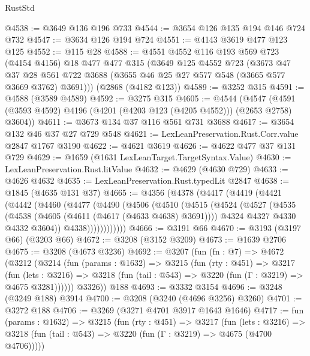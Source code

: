 \begin{lexlean}{RustStd}
\begin{coremodule}
@4538 := @3649 @136 @196 @733
@4544 := @3654 @126 @135 @194 @146 @724 @732
@4547 := @3634 @126 @194 @724
@4551 := @4143 @3619 @477 @123 @125
@4552 := @115 @28
@4588 := @4551
    @4552
    @116
    @193
    @569
    @723
    (@4154 @4156)
    @18
    @477
    @477
    @315
    (@3649
      @125
      @4552
      @723
      (@3673
        @47
        @37
        @28
        @561
        @722
        @3688
        (@3655 @46 @25 @27 @577 @548 (@3665 @577 @3669 @3762) @3691)))
    (@2868 (@4182 @123))
@4589 := @3252 @315
@4591 := @4588 (@3589 @4589)
@4592 := @3275 @315
@4605 := @4544
    (@4547 (@4591 (@3593 @4592) @4196 (@4201 (@4203 @123 (@4205 @4552))) (@2653 @2758) @3604))
@4611 := @3673 @134 @37 @116 @561 @731 @3688
@4617 := @3654 @132 @46 @37 @27 @729 @548
@4621 := LexLeanPreservation.Rust.Corr.value @2847 @1767 @3190
@4622 := @4621 @3619
@4626 := @4622 @477 @37 @131 @729
@4629 := @1659 (@1631 LexLeanTarget.TargetSyntax.Value)
@4630 := LexLeanPreservation.Rust.litValue
@4632 := @4629 (@4630 @729)
@4633 := @4626 @4632
@4635 := LexLeanPreservation.Rust.typedLit @2847
@4638 := @1845 (@4635 @131 @37)
@4665 := @4356
    (@4378
      (@4417
        (@4419
          (@4421
            (@4442
              (@4460
                (@4477
                  (@4490
                    (@4506
                      (@4510
                        (@4515
                          (@4524
                            (@4527
                              (@4535
                                (@4538 (@4605 (@4611 (@4617 (@4633 @4638) @3691))))
                                @4324
                                @4327
                                @4330
                                @4332
                                @3604))
                            @4338))))))))))))
@4666 := @3191 @66
@4670 := @3193 (@3197 @66) (@3203 @66)
@4672 := @3208 (@3152 @3209)
@4673 := @1639 @2706
@4675 := @3208 (@4673 @3236)
@4692 := @3207
    (fun (fn : @7) =>
    @4672
      (@3212
        (@3214
          (fun (params : @1632) =>
          @3215
            (fun (rty : @451) =>
            @3217
              (fun (lets : @3216) =>
              @3218 (fun (tail : @543) => @3220 (fun (Γ : @3219) => @4675 @3281))))))
        @3326))
    @188
@4693 := @3332 @3154
@4696 := @3248 (@3249 @188) @3914
@4700 := @3208 (@3240 (@4696 @3256) @3260)
@4701 := @3272 @188
@4706 := @3269 (@3271 @4701 @3917 @1643 @1646)
@4717 := fun (params : @1632) =>
  @3215
    (fun (rty : @451) =>
    @3217
      (fun (lets : @3216) =>
      @3218 (fun (tail : @543) => @3220 (fun (Γ : @3219) => @4675 (@4700 @4706)))))

\end{coremodule}
\end{lexlean}
